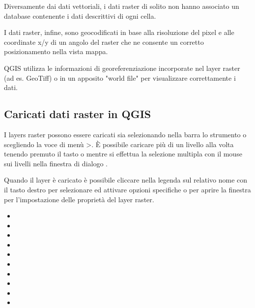 Diversamente dai dati vettoriali, i dati raster di solito non hanno associato
un database contenente i dati descrittivi di ogni cella.

I dati raster, infine, sono geocodificati in base alla risoluzione del pixel e
alle coordinate x/y di un angolo del raster che ne consente un corretto
posizionamento nella vista mappa. 

QGIS utilizza le informazioni di georeferenziazione incorporate nel layer
raster (ad es. GeoTiff) o in un apposito "world file" per visualizzare
correttamente i dati.
	
\subsection{Caricati dati raster in QGIS}\label{label_loadraster}

I layers raster possono essere caricati sia selezionando nella barra lo
strumento  o
scegliendo la voce di menù
>. È possibile caricare più di un livello alla volta tenendo premuto il
tasto  o  mentre si effettua la selezione
multipla con il mouse sui livelli nella finestra di dialogo .

Quando il layer è caricato è possibile cliccare nella legenda sul relativo
nome con il tasto destro per selezionare ed attivare opzioni specifiche o per
aprire la finestra per l'impostazione delle proprietà del layer raster.


\begin{itemize}
\item {}
\item {}
\item {}
\item {}
\item {}
\item {}
\item {}
\item {}
\item {}
\item {}
\end{itemize}
	
